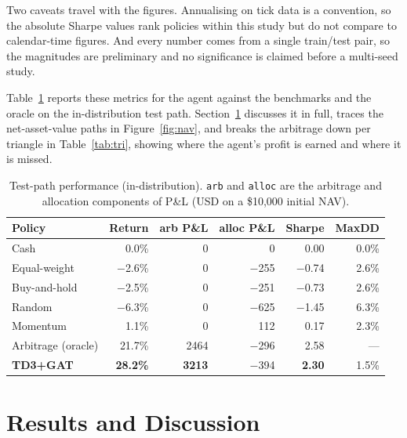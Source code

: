 \documentclass[12pt,a4paper]{article}
\begin{document}
Two caveats travel with the figures. Annualising on tick data is a convention, so the absolute
Sharpe values rank policies within this study but do not compare to calendar-time figures. And
every number comes from a single train/test pair, so the magnitudes are preliminary and no
significance is claimed before a multi-seed study.

Table~\ref{tab:main} reports these metrics for the agent against the benchmarks and the oracle on
the in-distribution test path. Section~\ref{sec:results} discusses it in full, traces the
net-asset-value paths in Figure~\ref{fig:nav}, and breaks the arbitrage down per triangle in
Table~\ref{tab:tri}, showing where the agent's profit is earned and where it is missed.

\begin{table}[t]
\centering
\caption{Test-path performance (in-distribution). \texttt{arb} and \texttt{alloc} are the
arbitrage and allocation components of P\&L (USD on a \$10{,}000 initial NAV).}
\label{tab:main}
\begin{tabular}{lrrrrr}
\toprule
Policy & Return & arb P\&L & alloc P\&L & Sharpe & MaxDD \\
\midrule
Cash               & \phantom{$-$}0.0\% & 0      & \phantom{$-$}0    & 0.00 & 0.0\% \\
Equal-weight       & $-$2.6\%           & 0      & $-$255            & $-$0.74 & 2.6\% \\
Buy-and-hold       & $-$2.5\%           & 0      & $-$251            & $-$0.73 & 2.6\% \\
Random             & $-$6.3\%           & 0      & $-$625            & $-$1.45 & 6.3\% \\
Momentum           & \phantom{$-$}1.1\% & 0      & \phantom{$-$}112  & 0.17 & 2.3\% \\
Arbitrage (oracle) & 21.7\%             & 2464   & $-$296            & 2.58 & --- \\
\textbf{TD3+GAT}   & \textbf{28.2\%}    & \textbf{3213} & $-$394     & \textbf{2.30} & 1.5\% \\
\bottomrule
\end{tabular}
\end{table}

\section{Results and Discussion}
\label{sec:results}
\end{document}
